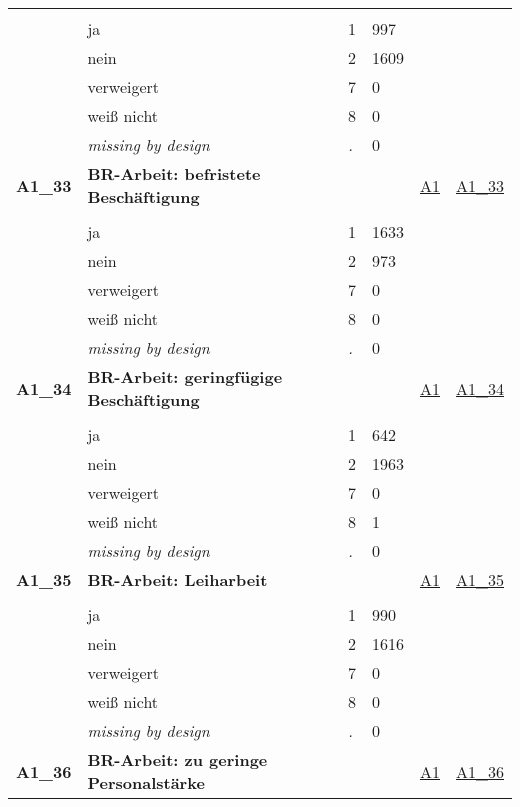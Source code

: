 \begin{longtable}{| L{2.45cm} | L{6cm} | C{1.5cm} | R{1cm} | C{2.25cm} | C{2.25cm} |}
   &  &  &  &  &  \\ 
   & ja & 1 & 997 &  &  \\ 
   & nein & 2 & 1609 &  &  \\ 
   & verweigert & 7 & 0 &  &  \\ 
   & weiß nicht & 8 & 0 &  &  \\ 
   & \textit{missing by design} & \textit{.} & 0 &  &  \\ 
   \midrule
\textbf{A1\_33}\label{var:A1:33} & \textbf{BR-Arbeit: befristete Beschäftigung} &  &  & \hyperref[A1]{A1} & \hyperref[var:suf:A1:33]{A1\_33} \\ 
   &  &  &  &  &  \\ 
   & ja & 1 & 1633 &  &  \\ 
   & nein & 2 & 973 &  &  \\ 
   & verweigert & 7 & 0 &  &  \\ 
   & weiß nicht & 8 & 0 &  &  \\ 
   & \textit{missing by design} & \textit{.} & 0 &  &  \\ 
   \midrule
\textbf{A1\_34}\label{var:A1:34} & \textbf{BR-Arbeit: geringfügige Beschäftigung} &  &  & \hyperref[A1]{A1} & \hyperref[var:suf:A1:34]{A1\_34} \\ 
   &  &  &  &  &  \\ 
   & ja & 1 & 642 &  &  \\ 
   & nein & 2 & 1963 &  &  \\ 
   & verweigert & 7 & 0 &  &  \\ 
   & weiß nicht & 8 & 1 &  &  \\ 
   & \textit{missing by design} & \textit{.} & 0 &  &  \\ 
   \midrule
\textbf{A1\_35}\label{var:A1:35} & \textbf{BR-Arbeit: Leiharbeit} &  &  & \hyperref[A1]{A1} & \hyperref[var:suf:A1:35]{A1\_35} \\ 
   &  &  &  &  &  \\ 
   & ja & 1 & 990 &  &  \\ 
   & nein & 2 & 1616 &  &  \\ 
   & verweigert & 7 & 0 &  &  \\ 
   & weiß nicht & 8 & 0 &  &  \\ 
   & \textit{missing by design} & \textit{.} & 0 &  &  \\ 
   \midrule
\textbf{A1\_36}\label{var:A1:36} & \textbf{BR-Arbeit: zu geringe Personalstärke} &  &  & \hyperref[A1]{A1} & \hyperref[var:suf:A1:36]{A1\_36} \\ 

\end{longtable}
